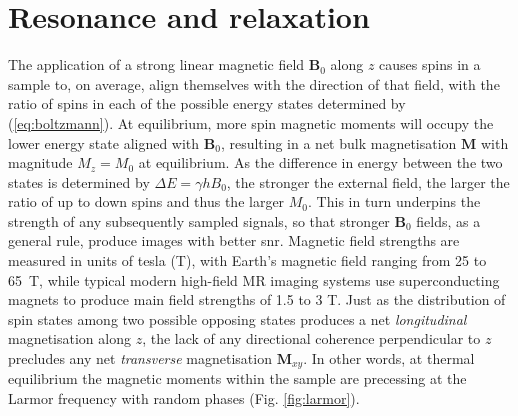 \section{Resonance and relaxation}

%
%

The application of a strong linear magnetic field $\mathbf{B}_0$ along $z$ causes spins in a sample to, on average, align themselves with the direction of that field, with the ratio of spins in each of the possible energy states determined by (\ref{eq:boltzmann}).
At equilibrium, more spin magnetic moments will occupy the lower energy state aligned with $\mathbf{B}_0$, resulting in a net bulk magnetisation $\mathbf{M}$ with magnitude $M_z=M_0$ at equilibrium.
As the difference in energy between the two states is determined by $\Delta E = \gamma h B_0$, the stronger the external field, the larger the ratio of up to down spins and thus the larger $M_0$.
This in turn underpins the strength of any subsequently sampled signals, so that stronger $\mathbf{B}_0$ fields, as a general rule, produce images with better \gls{snr}.
Magnetic field strengths are measured in units of tesla (T), with Earth's magnetic field ranging from 25 to 65~\textmu T, while typical modern high-field MR imaging systems use superconducting magnets to produce main field strengths of 1.5 to 3 T.
Just as the distribution of spin states among two possible opposing states produces a net \textit{longitudinal} magnetisation along $z$, the lack of any directional coherence perpendicular to $z$ precludes any net \textit{transverse} magnetisation $\mathbf{M}_{xy}$.
In other words, at thermal equilibrium the magnetic moments within the sample are precessing at the Larmor frequency with random phases (Fig. \ref{fig:larmor}).

